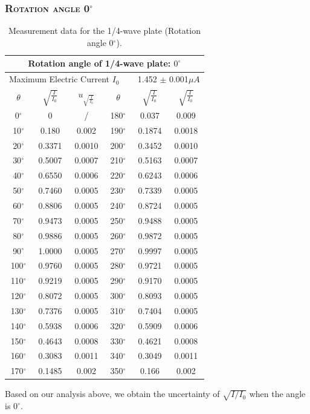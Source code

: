 \documentclass[a4paper,12pt]{article}
\begin{document}
\begin{appendices}
	\subsubsection{\textsc{Rotation angle 0$^\circ$}}
\begin{table}[h]
\begin{center}
\begin{tabular}{|c|c|c||c|c|c|}
\hline
\multicolumn{6}{|c|}{Rotation angle of 1/4-wave plate: $0^{\circ}$}\\
\hline 
\multicolumn{6}{|c|}{Maximum Electric Current $I_0$ ~~~ 1.452 $\pm$ 0.001$\mu A$}\\
\hline 
$\theta$ & $\sqrt{\frac{I}{I_0}}$ & $u_{\sqrt{\frac{I}{I_0}}}$ & $\theta$ & $\sqrt{\frac{I}{I_0}}$ & $\sqrt{\frac{I}{I_0}}$ \\
\hline
0$^{\circ}$ & 0 & / & 180$^{\circ}$ & 0.037 & 0.009 \\
\hline 
10$^{\circ}$ & 0.180 & 0.002 & 190$^{\circ}$ & 0.1874 & 0.0018\\
\hline
20$^{\circ}$ & 0.3371 & 0.0010 & 200$^{\circ}$ & 0.3452 & 0.0010\\
\hline
30$^{\circ}$ & 0.5007 & 0.0007 & 210$^{\circ}$ & 0.5163 & 0.0007\\
\hline
40$^{\circ}$ & 0.6550 & 0.0006 & 220$^{\circ}$ & 0.6243 & 0.0006\\
\hline
50$^{\circ}$ & 0.7460 & 0.0005 & 230$^{\circ}$ & 0.7339 & 0.0005\\
\hline
60$^{\circ}$ & 0.8806 & 0.0005 & 240$^{\circ}$ & 0.8724 & 0.0005\\
\hline
70$^{\circ}$ & 0.9473 & 0.0005 & 250$^{\circ}$ & 0.9488 & 0.0005\\
\hline
80$^{\circ}$ & 0.9886 & 0.0005 & 260$^{\circ}$ & 0.9872 & 0.0005\\
\hline
90$^{\circ}$ & 1.0000 & 0.0005 & 270$^{\circ}$ & 0.9997 & 0.0005\\
\hline
100$^{\circ}$ & 0.9760 & 0.0005 & 280$^{\circ}$ & 0.9721 & 0.0005\\
\hline
110$^{\circ}$ & 0.9219 & 0.0005 & 290$^{\circ}$ & 0.9170 & 0.0005\\
\hline
120$^{\circ}$ & 0.8072 & 0.0005 & 300$^{\circ}$ & 0.8093 & 0.0005\\
\hline
130$^{\circ}$ & 0.7376 & 0.0005 & 310$^{\circ}$ & 0.7404 & 0.0005\\
\hline
140$^{\circ}$ & 0.5938 & 0.0006 & 320$^{\circ}$ & 0.5909 & 0.0006\\
\hline
150$^{\circ}$ & 0.4643 & 0.0008 & 330$^{\circ}$ & 0.4621 & 0.0008\\
\hline
160$^{\circ}$ & 0.3083 & 0.0011 & 340$^{\circ}$ & 0.3049 & 0.0011\\
\hline
170$^{\circ}$ & 0.1485 & 0.002 & 350$^{\circ}$ & 0.166 & 0.002\\
\hline
\end{tabular}
\caption{Measurement data for the 1/4-wave plate (Rotation angle 0$^{\circ}$).}
\end{center}
\end{table}
Based on our analysis above, we obtain the uncertainty of $\sqrt{I/I_0}$ when the angle is $0^{\circ}$.



\end{appendices}
\end{document}
